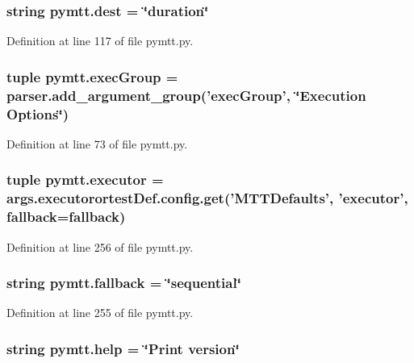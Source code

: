 \hypertarget{namespacepymtt_a9ecea46ee6082edb9bbdd8393829e18e}{
\subsubsection[{dest}]{\setlength{\rightskip}{0pt plus 5cm}string pymtt.\-dest = \char`\"{}duration\char`\"{}}}\label{namespacepymtt_a9ecea46ee6082edb9bbdd8393829e18e}


Definition at line 117 of file pymtt.\-py.

\hypertarget{namespacepymtt_a0f52dbd5d46583e466305a708dea64a1}{
\subsubsection[{exec\-Group}]{\setlength{\rightskip}{0pt plus 5cm}tuple pymtt.\-exec\-Group = parser.\-add\-\_\-argument\-\_\-group('exec\-Group', \char`\"{}Execution Options\char`\"{})}}\label{namespacepymtt_a0f52dbd5d46583e466305a708dea64a1}


Definition at line 73 of file pymtt.\-py.

\hypertarget{namespacepymtt_a283715e769294f7b1362c85498cdf2a3}{
\subsubsection[{executor}]{\setlength{\rightskip}{0pt plus 5cm}tuple pymtt.\-executor = args.\-executorortest\-Def.\-config.\-get('M\-T\-T\-Defaults', 'executor', {\bf fallback}={\bf fallback})}}\label{namespacepymtt_a283715e769294f7b1362c85498cdf2a3}


Definition at line 256 of file pymtt.\-py.

\hypertarget{namespacepymtt_a5d5ee597f85e5c40ec6a923a4398c291}{
\subsubsection[{fallback}]{\setlength{\rightskip}{0pt plus 5cm}string pymtt.\-fallback = \char`\"{}sequential\char`\"{}}}\label{namespacepymtt_a5d5ee597f85e5c40ec6a923a4398c291}


Definition at line 255 of file pymtt.\-py.

\hypertarget{namespacepymtt_a21e88c39af91deb569da20633d245b09}{
\subsubsection[{help}]{\setlength{\rightskip}{0pt plus 5cm}string pymtt.\-help = \char`\"{}Print version\char`\"{}}}\label{namespacepymtt_a21e88c39af91deb569da20633d245b09}


